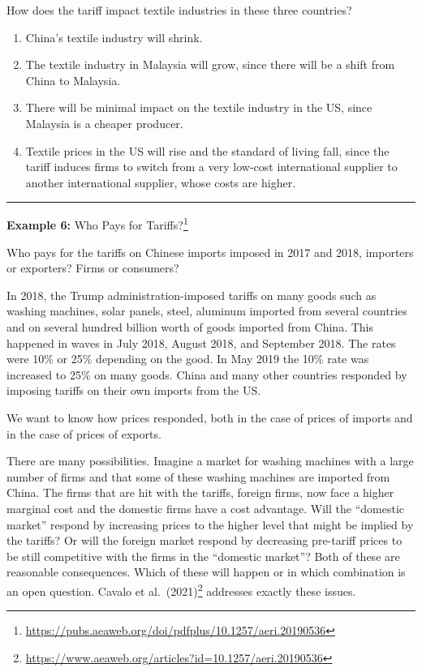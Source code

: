 \documentclass[
]{book}
\begin{document}
How does the tariff impact textile industries in these three countries?

\begin{enumerate}
\def\labelenumi{\arabic{enumi}.}
\item
  China's textile industry will shrink.
\item
  The textile industry in Malaysia will grow, since there will be a shift from China to Malaysia.
\item
  There will be minimal impact on the textile industry in the US, since Malaysia is a cheaper producer.
\item
  Textile prices in the US will rise and the standard of living fall, since the tariff induces firms to switch from a very low-cost international supplier to another international supplier, whose costs are higher.
\end{enumerate}

\begin{center}\rule{0.5\linewidth}{0.5pt}\end{center}

\textbf{Example 6:} Who Pays for Tariffs?\footnote{\url{https://pubs.aeaweb.org/doi/pdfplus/10.1257/aeri.20190536}}

Who pays for the tariffs on Chinese imports imposed in 2017 and 2018, importers or exporters? Firms or consumers?

In 2018, the Trump administration-imposed tariffs on many goods such as washing machines, solar panels, steel, aluminum imported from several countries and on several hundred billion worth of goods imported from China. This happened in waves in July 2018, August 2018, and September 2018. The rates were 10\% or 25\% depending on the good. In May 2019 the 10\% rate was increased to 25\% on many goods. China and many other countries responded by imposing tariffs on their own imports from the US.

We want to know how prices responded, both in the case of prices of imports and in the case of prices of exports.

There are many possibilities. Imagine a market for washing machines with a large number of firms and that some of these washing machines are imported from China. The firms that are hit with the tariffs, foreign firms, now face a higher marginal cost and the domestic firms have a cost advantage. Will the ``domestic market'' respond by increasing prices to the higher level that might be implied by the tariffs? Or will the foreign market respond by decreasing pre-tariff prices to be still competitive with the firms in the ``domestic market''? Both of these are reasonable consequences. Which of these will happen or in which combination is an open question. Cavalo et al.~(2021)\footnote{\url{https://www.aeaweb.org/articles?id=10.1257/aeri.20190536}} addresses exactly these issues.
\end{document}
